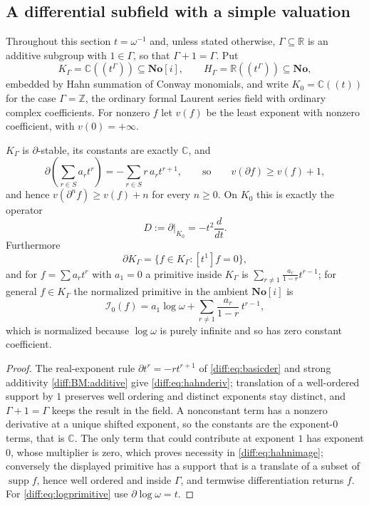 \documentclass[11pt,letterpaper]{article}
\numberwithin{equation}{section}
\theoremstyle{definition}
\theoremstyle{remark}
\newcommand{\No}{\mathbf{No}}
\newcommand{\SC}{\mathbf{No}[i]}
\newcommand{\R}{\mathbb R}
\newcommand{\C}{\mathbb C}
\newcommand{\Z}{\mathbb Z}
\newcommand{\der}{\partial}
\newcommand{\Izero}{\mathcal I_{0}}
\newcommand{\supp}{\operatorname{supp}}
\begin{document}
\subsection{A differential subfield with a simple valuation}
\label{diff:sub:laurentparent}

Throughout this section $t=\omega^{-1}$ and, unless stated otherwise,
$\Gamma\subseteq\R$ is an additive subgroup with $1\in\Gamma$, so that
$\Gamma+1=\Gamma$. Put
\[
 K_{\Gamma}=\C((t^{\Gamma}))\subseteq\SC,
 \qquad
 H_{\Gamma}=\R((t^{\Gamma}))\subseteq\No,
\]
embedded by Hahn summation of Conway monomials, and write
$K_{0}=\C((t))$ for the case $\Gamma=\Z$, the ordinary formal Laurent series
field with ordinary complex coefficients. For nonzero $f$ let $v(f)$ be the
least exponent with nonzero coefficient, with $v(0)=+\infty$.

\begin{proposition}
\label{diff:prop:hahnderiv}
$K_{\Gamma}$ is $\der$-stable, its constants are exactly $\C$, and
\begin{equation}\label{diff:eq:hahnderiv}
 \der\!\left(\sum_{r\in S}a_{r}t^{r}\right)=-\sum_{r\in S}r\,a_{r}t^{r+1},
 \qquad\text{so}\qquad
 v(\der f)\geq v(f)+1 ,
\end{equation}
and hence $v(\der^{n}f)\geq v(f)+n$ for every $n\geq0$. On $K_{0}$ this is
exactly the operator
\begin{equation}\label{diff:eq:laurentD}
 D:=\der|_{K_{0}}=-t^{2}\frac{d}{dt}.
\end{equation}
Furthermore
\begin{equation}\label{diff:eq:hahnimage}
 \der K_{\Gamma}=\{f\in K_{\Gamma}:[t^{1}]f=0\},
\end{equation}
and for $f=\sum a_{r}t^{r}$ with $a_{1}=0$ a primitive inside $K_{\Gamma}$ is
$\sum_{r\neq1}\frac{a_{r}}{1-r}t^{r-1}$; for general $f\in K_{\Gamma}$ the
normalized primitive in the ambient $\SC$ is
\begin{equation}\label{diff:eq:logprimitive}
 \Izero(f)=a_{1}\log\omega+\sum_{r\neq1}\frac{a_{r}}{1-r}\,t^{r-1},
\end{equation}
which is normalized because $\log\omega$ is purely infinite and so has zero
constant coefficient.
\end{proposition}
\begin{proof}
The real-exponent rule $\der t^{r}=-rt^{r+1}$ of \cref{diff:eq:basicder} and
strong additivity \ref{diff:BM:additive} give \cref{diff:eq:hahnderiv};
translation of a well-ordered support by $1$ preserves well ordering and
distinct exponents stay distinct, and $\Gamma+1=\Gamma$ keeps the result in
the field. A nonconstant term has a nonzero derivative at a unique shifted
exponent, so the constants are the exponent-$0$ terms, that is $\C$. The only
term that could contribute at exponent $1$ has exponent $0$, whose multiplier
is zero, which proves necessity in \cref{diff:eq:hahnimage}; conversely the
displayed primitive has a support that is a translate of a subset of
$\supp f$, hence well ordered and inside $\Gamma$, and termwise
differentiation returns $f$. For \cref{diff:eq:logprimitive} use
$\der\log\omega=t$.
\end{proof}
\end{document}
